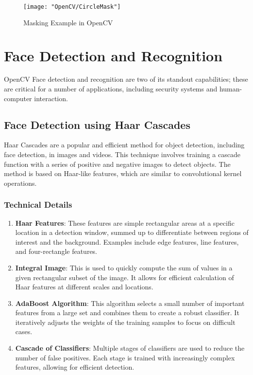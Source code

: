 \begin{figure}[h]
	\centering
	\texttt{[image: "OpenCV/CircleMask"]}
	\caption{Masking Example in OpenCV}\label{Masking Example}
\end{figure}

\section{Face Detection and Recognition}

OpenCV Face detection and recognition are two of its standout capabilities; these are critical for a number of applications, including security systems and human-computer interaction. 

\subsection{Face Detection using Haar Cascades}

Haar Cascades are a popular and efficient method for object detection, including face detection, in images and videos. This technique involves training a cascade function with a series of positive and negative images to detect objects. The method is based on Haar-like features, which are similar to convolutional kernel operations.

\subsubsection{Technical Details}
\begin{enumerate}
	\item \textbf{Haar Features}: These features are simple rectangular areas at a specific location in a detection window, summed up to differentiate between regions of interest and the background. Examples include edge features, line features, and four-rectangle features.
	\item \textbf{Integral Image}: This is used to quickly compute the sum of values in a given rectangular subset of the image. It allows for efficient calculation of Haar features at different scales and locations.
	\item \textbf{AdaBoost Algorithm}: This algorithm selects a small number of important features from a large set and combines them to create a robust classifier. It iteratively adjusts the weights of the training samples to focus on difficult cases.
	\item \textbf{Cascade of Classifiers}: Multiple stages of classifiers are used to reduce the number of false positives. Each stage is trained with increasingly complex features, allowing for efficient detection.\cite{viola:2001}
\end{enumerate}


